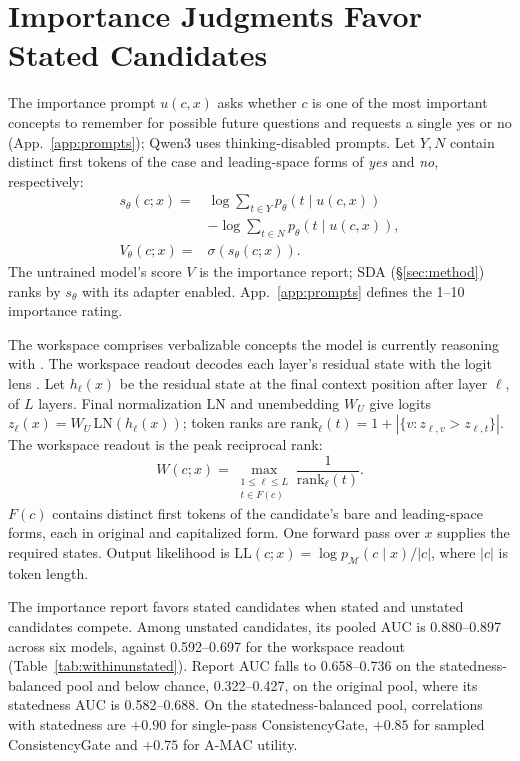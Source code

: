 \section{Importance Judgments Favor Stated Candidates}\label{sec:gap}

The importance prompt $u(c,x)$ asks whether $c$ is one of the most important concepts to remember for possible future questions and requests a single yes or no (App.~\ref{app:prompts}); Qwen3 uses thinking-disabled prompts. Let $Y,N$ contain distinct first tokens of the case and leading-space forms of \emph{yes} and \emph{no}, respectively:
\begin{equation}
\begin{split}
s_\theta(c;x)={}&\log\!\sum_{t\in Y}p_\theta(t\mid u(c,x))\\
&-\log\!\sum_{t\in N}p_\theta(t\mid u(c,x)),\\
V_\theta(c;x)={}&\sigma\!\left(s_\theta(c;x)\right).
\end{split}
\label{eq:score}
\end{equation}
The untrained model's score $V$ is the importance report; SDA (\S\ref{sec:method}) ranks by $s_\theta$ with its adapter enabled. App.~\ref{app:prompts} defines the 1--10 importance rating.

The workspace comprises verbalizable concepts the model is currently reasoning with \citep{anthropic2026workspace}. The workspace readout decodes each layer's residual state with the logit lens \citep{nostalgebraist2020logitlens,anthropic2026workspace}. Let $h_\ell(x)$ be the residual state at the final context position after layer $\ell$, of $L$ layers. Final normalization $\mathrm{LN}$ and unembedding $W_U$ give logits $z_\ell(x)=W_U\,\mathrm{LN}(h_\ell(x))$; token ranks are $\mathrm{rank}_\ell(t)=1+|\{v:z_{\ell,v}>z_{\ell,t}\}|$. The workspace readout is the peak reciprocal rank:
\begin{equation}
W(c;x)=\max_{\substack{1\leq\ell\leq L\\ t\in F(c)}}
\frac{1}{\mathrm{rank}_\ell(t)}.
\label{eq:wrr}
\end{equation}
$F(c)$ contains distinct first tokens of the candidate's bare and leading-space forms, each in original and capitalized form. One forward pass over $x$ supplies the required states. Output likelihood is $\mathrm{LL}(c;x)=\log p_{\mathcal M}(c\mid x)/|c|$, where $|c|$ is token length.

The importance report favors stated candidates when stated and unstated candidates compete. Among unstated candidates, its pooled AUC is 0.880--0.897 across six models, against 0.592--0.697 for the workspace readout (Table~\ref{tab:withinunstated}). Report AUC falls to 0.658--0.736 on the statedness-balanced pool and below chance, 0.322--0.427, on the original pool, where its statedness AUC is 0.582--0.688. On the statedness-balanced pool, correlations with statedness are $+0.90$ for single-pass ConsistencyGate, $+0.85$ for sampled ConsistencyGate and $+0.75$ for A-MAC utility.


